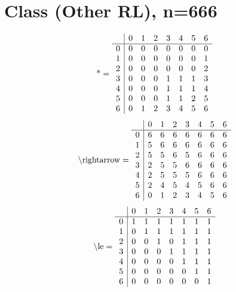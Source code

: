\documentclass[11pt]{article}
\begin{document}
\section{Class (Other RL), n=666}
\[\text{*} = 
\begin{array}{r | r r r r r r r}
 & 0 & 1 & 2 & 3 & 4 & 5 & 6 \\ \hline
0 & 0 & 0 & 0 & 0 & 0 & 0 & 0 \\
1 & 0 & 0 & 0 & 0 & 0 & 0 & 1 \\
2 & 0 & 0 & 0 & 0 & 0 & 0 & 2 \\
3 & 0 & 0 & 0 & 1 & 1 & 1 & 3 \\
4 & 0 & 0 & 0 & 1 & 1 & 1 & 4 \\
5 & 0 & 0 & 0 & 1 & 1 & 2 & 5 \\
6 & 0 & 1 & 2 & 3 & 4 & 5 & 6 \\
\end{array}
\]
\[\text{\textbackslash rightarrow} = 
\begin{array}{r | r r r r r r r}
 & 0 & 1 & 2 & 3 & 4 & 5 & 6 \\ \hline
0 & 6 & 6 & 6 & 6 & 6 & 6 & 6 \\
1 & 5 & 6 & 6 & 6 & 6 & 6 & 6 \\
2 & 5 & 5 & 6 & 5 & 6 & 6 & 6 \\
3 & 2 & 5 & 5 & 6 & 6 & 6 & 6 \\
4 & 2 & 5 & 5 & 5 & 6 & 6 & 6 \\
5 & 2 & 4 & 5 & 4 & 5 & 6 & 6 \\
6 & 0 & 1 & 2 & 3 & 4 & 5 & 6 \\
\end{array}
\]
\[\text{\textbackslash le} = 
\begin{array}{r | r r r r r r r}
 & 0 & 1 & 2 & 3 & 4 & 5 & 6 \\ \hline
0 & 1 & 1 & 1 & 1 & 1 & 1 & 1 \\
1 & 0 & 1 & 1 & 1 & 1 & 1 & 1 \\
2 & 0 & 0 & 1 & 0 & 1 & 1 & 1 \\
3 & 0 & 0 & 0 & 1 & 1 & 1 & 1 \\
4 & 0 & 0 & 0 & 0 & 1 & 1 & 1 \\
5 & 0 & 0 & 0 & 0 & 0 & 1 & 1 \\
6 & 0 & 0 & 0 & 0 & 0 & 0 & 1 \\
\end{array}
\]
\end{document}
